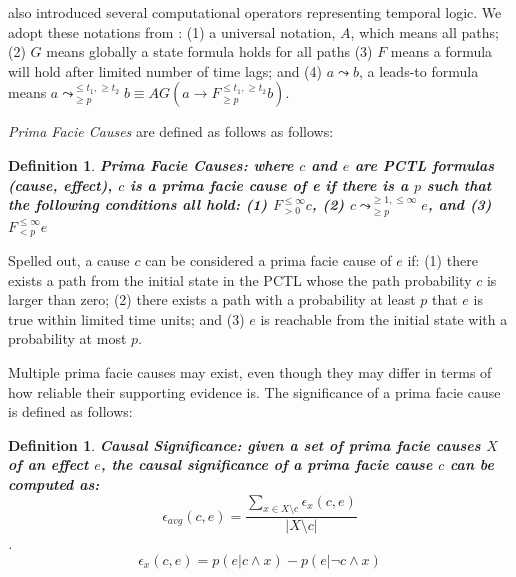 \documentclass[man,biblatex,floatsintext]{apa6}
\newtheorem{defn}[thm]{Definition}
\begin{document}
\textcite{hansson1994logic} also introduced several computational operators representing temporal logic. We adopt these notations from \textcite{kleinberg_uai09,kleinberg2012causality}: (1) a universal notation, $A$, which means all paths; (2) $G$ means globally a state formula holds for all paths (3) $F$ means a formula will hold after limited number of time lags; and (4) $a \leadsto b$, a leads-to formula means $a \leadsto _{\geq p}^{\leq t_{1}, \geq t_{2}} b \equiv AG (a \rightarrow F_{\geq p}^{\leq t_{1}, \geq t_{2}} b)$.

\emph{Prima Facie Causes} are defined as follows as follows: 

\begin{defn} \textbf{Prima Facie Causes\parencite{kleinberg_uai09}: where $c$ and $e$ are PCTL formulas (cause, effect), $c$ is a prima facie cause of e if there is a $p$ such that the following conditions all hold: (1) $F_{> 0}^{\leq \infty }c$, (2) $c\leadsto_{\geq p}^{\geq 1,\leq \infty}e$, and (3) $F_{<p}^{\leq \infty }e$}
\end{defn}

Spelled out, a cause $c$ can be considered a prima facie cause of $e$ if: (1) there exists a path from the initial state in the PCTL whose the path probability $c$ is larger than zero; (2) there exists a path with a probability at least $p$ that $e$ is true within limited time units; and (3) $e$ is reachable from the initial state with a probability at most $p$. 

Multiple prima facie causes may exist, even though they may differ in terms of how reliable their supporting evidence is. The significance of a prima facie cause is defined as follows:

\begin{defn}
\textbf{Causal Significance\parencite{kleinberg_uai09}: given a set of prima facie causes $X$ of an effect $e$, the causal significance of a prima facie cause $c$ can be computed as:}
\label{def:CausalSig}
\begin{equation}
\epsilon _{avg} (c,e) = \frac{\sum_{x\in X\setminus c} \epsilon _{x} (c,e) }{\left | X \setminus c \right |}
\end{equation}.
\begin{equation}
\epsilon _{x} (c,e) = p(e|c\wedge x)-p(e|\neg c\wedge x)
\end{equation}
\end{defn}
\end{document}
